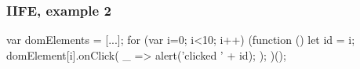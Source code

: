 \begin{frame}[fragile] \frametitle{IIFE, example 2}

\begin{CodeBox}{}
var domElements = [...];
for (var i=0; i<10; i++) {
  (function () {
    let id = i;
    domElement[i].onClick(
      _ => { alert('clicked ' + id); }
    );
  })();  
}
\end{CodeBox}
\end{frame}

